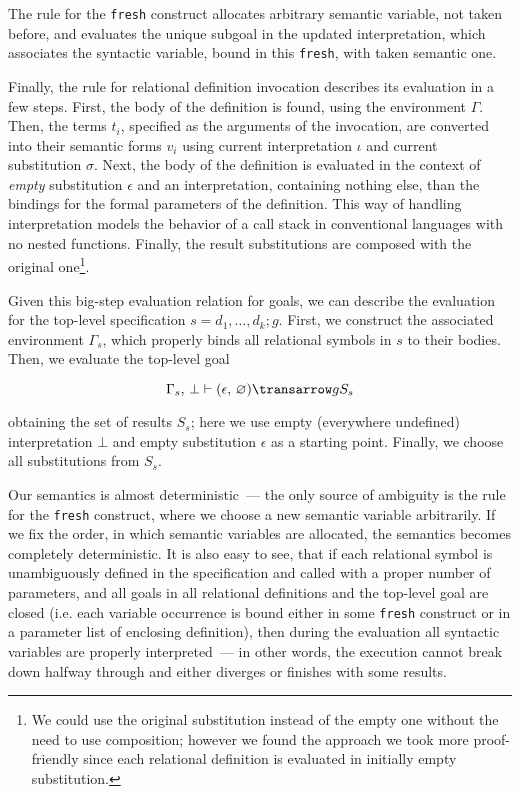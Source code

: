 The rule for the \lstinline|fresh| construct allocates arbitrary semantic variable, not taken before, and evaluates the unique subgoal in the updated interpretation, which
associates the syntactic variable, bound in this \lstinline|fresh|, with taken semantic one.

Finally, the rule for relational definition invocation describes its evaluation in a few steps. First, the body of the definition is found, using the environment $\Gamma$. 
Then, the terms $t_i$, specified as the arguments of the invocation, are converted into their semantic forms $v_i$ using current interpretation $\iota$ and current 
substitution $\sigma$. Next, the body of the definition is evaluated in the context of \emph{empty} substitution $\epsilon$ and an interpretation, containing nothing
else, than the bindings for the formal parameters of the definition. This way of handling interpretation models the behavior of a call stack in conventional languages
with no nested functions. Finally, the result substitutions are composed with the original one\footnote{We could use the original
substitution instead of the empty one without the need to use composition; however we found the approach we took more proof-friendly since each relational definition is evaluated
in initially empty substitution.}. 

Given this big-step evaluation relation for goals, we can describe the evaluation for the top-level specification $s=d_1,\dots,d_k;g$. First, we construct the associated environment
$\Gamma_s$, which properly binds all relational symbols in $s$ to their bodies. Then, we evaluate the top-level goal

$$
\otrans{\Gamma_s,\,\bot}{(\epsilon,\,\emptyset)}{g}{S_s}
$$

\noindent obtaining the set of results $S_s$; here we use empty (everywhere undefined) interpretation $\bot$ and empty substitution $\epsilon$ as a starting point. 
Finally, we choose all substitutions from $S_s$. 

Our semantics is almost deterministic~--- the only source of ambiguity is the rule for the \lstinline|fresh| construct, where we choose a new semantic variable
arbitrarily. If we fix the order, in which semantic variables are allocated, the semantics becomes completely deterministic. It is also easy to see, that if each
relational symbol is unambiguously defined in the specification and called with a proper number of parameters, and all goals in all relational definitions and the 
top-level goal are closed (i.e. each variable occurrence is bound either in some \lstinline|fresh| construct or in a parameter list of enclosing definition), 
then during the evaluation all syntactic variables are properly interpreted~--- in other words, the execution cannot break down halfway through and either diverges or 
finishes with some results.

